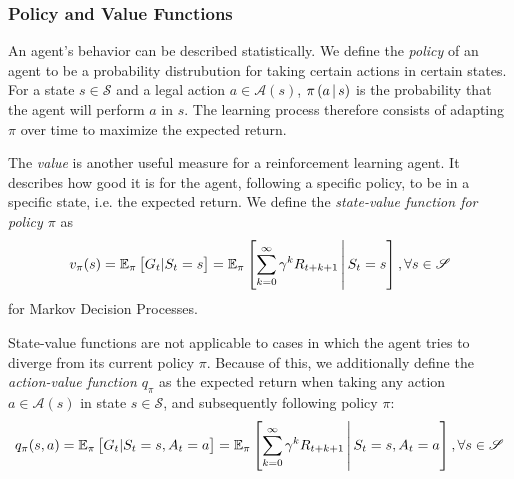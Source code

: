 \subsubsection{Policy and Value Functions}
An agent's behavior can be described statistically. We define the \textit{policy} of an agent to be a probability distrubution for taking certain actions in certain states. For a state $s \in \mathscr{S}$ and a legal action $a \in \mathscr{A}(s)$, $\pi\left(a \,\middle|\, s\right)$ is the probability that the agent will perform $a$ in $s$. The learning process therefore consists of adapting $\pi$ over time to maximize the expected return. \cite{sutton}

The \textit{value} is another useful measure for a reinforcement learning agent. It describes how good it is for the agent, following a specific policy, to be in a specific state, i.e. the expected return. We define the \textit{state-value function for policy $\pi$} as
\begin{equation*}
    v_\pi(s) = \mathbb{E}_\pi\left[G_t | S_t = s\right]
             = \mathbb{E}_\pi\left[\sum_{k=0}^\infty \gamma^k R_{t+k+1} \,\middle|\, S_t = s\right], \forall s \in \mathscr{S}
\end{equation*}
for Markov Decision Processes. \cite{sutton}

State-value functions are not applicable to cases in which the agent tries to diverge from its current policy $\pi$. Because of this, we additionally define the \textit{action-value function $q_\pi$} as the expected return when taking any action $a \in \mathscr{A}(s)$ in state $s \in \mathscr{S}$, and subsequently following policy $\pi$: \cite{sutton}
\begin{equation*}
    q_\pi(s, a) = \mathbb{E}_\pi\left[G_t | S_t = s, A_t = a\right]
             = \mathbb{E}_\pi\left[\sum_{k=0}^\infty \gamma^k R_{t+k+1} \,\middle|\, S_t = s, A_t = a\right], \forall s \in \mathscr{S}
\end{equation*}